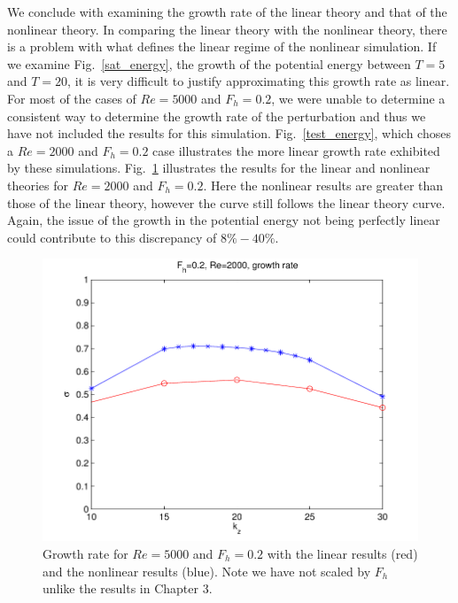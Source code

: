 We conclude with examining the growth rate of the linear theory and that of the nonlinear theory. In comparing the linear theory with the nonlinear theory, there is a problem with what defines the linear regime of the nonlinear simulation. If we examine Fig.~\ref{sat_energy}, the growth of the potential energy between $T=5$ and $T=20$, it is very difficult to justify approximating this growth rate as linear. For most of the cases of $Re=5000$ and $F_{h}=0.2$, we were unable to determine a consistent way to determine the growth rate of the perturbation and thus we have not included the results for this simulation. Fig.~\ref{test_energy}, which choses a $Re=2000$ and $F_{h}=0.2$ case illustrates the more linear growth rate exhibited by these simulations. Fig.~\ref{growth_rates_nonlinear} illustrates the results for the linear and nonlinear theories for $Re=2000$ and $F_{h}=0.2$. Here the nonlinear results are greater than those of the linear theory, however the curve still follows the linear theory curve. Again, the issue of the growth in the potential energy not being perfectly linear could contribute to this discrepancy of $8\%-40\%$. 
\begin{figure}
\begin{center}
\includegraphics[width=\textwidth]{re2000_fh02_growth_rates} 
\caption{Growth rate for $Re=5000$ and $F_{h}=0.2$ with the linear results (red) and the nonlinear results (blue). Note we have not scaled by $F_{h}$ unlike the results in Chapter 3.}
\label{growth_rates_nonlinear}
\end{center}
\end{figure}
